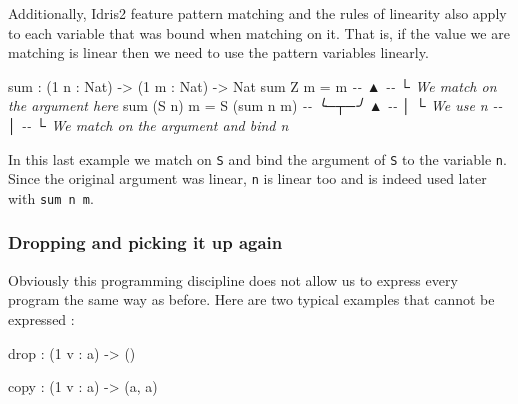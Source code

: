 \documentclass[
]{article}
\newenvironment{Shaded}{}{}
\newcommand{\CommentTok}[1]{\textcolor[rgb]{0.38,0.63,0.69}{\textit{#1}}}
\newcommand{\DataTypeTok}[1]{\textcolor[rgb]{0.56,0.13,0.00}{#1}}
\newcommand{\DecValTok}[1]{\textcolor[rgb]{0.25,0.63,0.44}{#1}}
\newcommand{\FunctionTok}[1]{\textcolor[rgb]{0.02,0.16,0.49}{#1}}
\newcommand{\NormalTok}[1]{#1}
\newcommand{\OperatorTok}[1]{\textcolor[rgb]{0.40,0.40,0.40}{#1}}
\newcommand{\OtherTok}[1]{\textcolor[rgb]{0.00,0.44,0.13}{#1}}
\begin{document}
Additionally, Idris2 feature pattern matching and the rules of linearity
also apply to each variable that was bound when matching on it. That is,
if the value we are matching is linear then we need to use the pattern
variables linearly.

\begin{Shaded}
\begin{Highlighting}[]
\FunctionTok{sum} \OperatorTok{:}\NormalTok{ (}\DecValTok{1}\NormalTok{ n }\OperatorTok{:} \DataTypeTok{Nat}\NormalTok{) }\OtherTok{{-}\textgreater{}}\NormalTok{ (}\DecValTok{1}\NormalTok{ m }\OperatorTok{:} \DataTypeTok{Nat}\NormalTok{) }\OtherTok{{-}\textgreater{}} \DataTypeTok{Nat}
\FunctionTok{sum} \DataTypeTok{Z}\NormalTok{ m }\OtherTok{=}\NormalTok{ m}
\CommentTok{{-}{-}  ▲}
\CommentTok{{-}{-}  └ We match on the argument here}
\FunctionTok{sum}\NormalTok{ (}\DataTypeTok{S}\NormalTok{ n) m }\OtherTok{=} \DataTypeTok{S}\NormalTok{ (}\FunctionTok{sum}\NormalTok{ n m)}
\CommentTok{{-}{-}  ╰─┬─╯            ▲}
\CommentTok{{-}{-}    │              └ We use \textasciigrave{}n\textasciigrave{}}
\CommentTok{{-}{-}    │}
\CommentTok{{-}{-}    └ We match on the argument and bind \textasciigrave{}n\textasciigrave{}}
\end{Highlighting}
\end{Shaded}

In this last example we match on \texttt{S} and bind the argument of
\texttt{S} to the variable \texttt{n}. Since the original argument was
linear, \texttt{n} is linear too and is indeed used later with
\texttt{sum\ n\ m}.

\hypertarget{dropping-and-picking-it-up-again}{%
\subsubsection{Dropping and picking it up
again}\label{dropping-and-picking-it-up-again}}

Obviously this programming discipline does not allow us to express every
program the same way as before. Here are two typical examples that
cannot be expressed :

\begin{Shaded}
\begin{Highlighting}[]
\FunctionTok{drop} \OperatorTok{:}\NormalTok{ (}\DecValTok{1}\NormalTok{ v }\OperatorTok{:}\NormalTok{ a) }\OtherTok{{-}\textgreater{}}\NormalTok{ ()}

\NormalTok{copy }\OperatorTok{:}\NormalTok{ (}\DecValTok{1}\NormalTok{ v }\OperatorTok{:}\NormalTok{ a) }\OtherTok{{-}\textgreater{}}\NormalTok{ (a, a)}
\end{Highlighting}
\end{Shaded}
\end{document}
